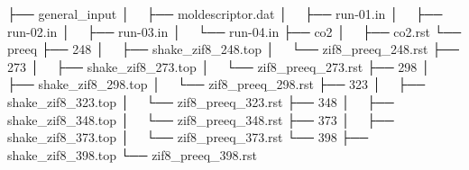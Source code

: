 \documentclass[
  letterpaper,
  DIV=11,
  numbers=noendperiod]{scrreprt}
\newenvironment{Shaded}{\begin{snugshade}}{\end{snugshade}}
\newcommand{\ExtensionTok}[1]{\textcolor[rgb]{0.00,0.23,0.31}{#1}}
\newcommand{\NormalTok}[1]{\textcolor[rgb]{0.00,0.23,0.31}{#1}}
\begin{document}
\begin{tcolorbox}[enhanced jigsaw, title=\textcolor{quarto-callout-note-color}{\faInfo}\hspace{0.5em}{Note}, colbacktitle=quarto-callout-note-color!10!white, bottomtitle=1mm, breakable, colframe=quarto-callout-note-color-frame, toprule=.15mm, opacitybacktitle=0.6, bottomrule=.15mm, titlerule=0mm, arc=.35mm, rightrule=.15mm, toptitle=1mm, coltitle=black, left=2mm, opacityback=0, colback=white, leftrule=.75mm]

\begin{Shaded}
\begin{Highlighting}[]
\ExtensionTok{├──}\NormalTok{ general\_input}
\ExtensionTok{│  }\NormalTok{ ├── moldescriptor.dat}
\ExtensionTok{│  }\NormalTok{ ├── run{-}01.in}
\ExtensionTok{│  }\NormalTok{ ├── run{-}02.in}
\ExtensionTok{│  }\NormalTok{ ├── run{-}03.in}
\ExtensionTok{│  }\NormalTok{ └── run{-}04.in}
\ExtensionTok{├──}\NormalTok{ co2}
\ExtensionTok{│  }\NormalTok{ ├── co2.rst}
\ExtensionTok{└──}\NormalTok{ preeq}
    \ExtensionTok{├──}\NormalTok{ 248}
    \ExtensionTok{│  }\NormalTok{ ├── shake\_zif8\_248.top}
    \ExtensionTok{│  }\NormalTok{ └── zif8\_preeq\_248.rst}
    \ExtensionTok{├──}\NormalTok{ 273}
    \ExtensionTok{│  }\NormalTok{ ├── shake\_zif8\_273.top}
    \ExtensionTok{│  }\NormalTok{ └── zif8\_preeq\_273.rst}
    \ExtensionTok{├──}\NormalTok{ 298}
    \ExtensionTok{│  }\NormalTok{ ├── shake\_zif8\_298.top}
    \ExtensionTok{│  }\NormalTok{ └── zif8\_preeq\_298.rst}
    \ExtensionTok{├──}\NormalTok{ 323}
    \ExtensionTok{│  }\NormalTok{ ├── shake\_zif8\_323.top}
    \ExtensionTok{│  }\NormalTok{ └── zif8\_preeq\_323.rst}
    \ExtensionTok{├──}\NormalTok{ 348}
    \ExtensionTok{│  }\NormalTok{ ├── shake\_zif8\_348.top}
    \ExtensionTok{│  }\NormalTok{ └── zif8\_preeq\_348.rst}
    \ExtensionTok{├──}\NormalTok{ 373}
    \ExtensionTok{│  }\NormalTok{ ├── shake\_zif8\_373.top}
    \ExtensionTok{│  }\NormalTok{ └── zif8\_preeq\_373.rst}
    \ExtensionTok{└──}\NormalTok{ 398}
        \ExtensionTok{├──}\NormalTok{ shake\_zif8\_398.top}
        \ExtensionTok{└──}\NormalTok{ zif8\_preeq\_398.rst}
\end{Highlighting}
\end{Shaded}

\end{tcolorbox}
\end{document}

